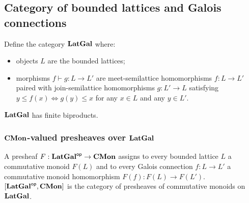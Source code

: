 \subsection{Category of bounded lattices and Galois connections}

Define the category $\mathbf{LatGal}$ where:
\begin{itemize}
\item objects $L$ are the bounded lattices;
\item morphisms $f \vdash g: L \to L'$ are meet-semilattice homomorphisms $f: L \to L'$ paired with
join-semilattice homomorphisms $g: L' \to L$ satisfying $y \leq f(x) \iff g(y) \leq x$ for any $x \in L$ and any
$y \in L'$.
\end{itemize}

\noindent $\mathbf{LatGal}$ has finite biproducts.

\subsubsection{$\mathbf{CMon}$-valued presheaves over $\mathbf{LatGal}$}

A presheaf $F: \mathbf{LatGal}^{\mathsf{op}} \to \mathbf{CMon}$ assigns to every bounded lattice $L$ a commutative monoid $F(L)$ and to
every Galois connection $f: L \to L'$ a commutative monoid homomorphism $F(f): F(L) \to F(L')$.
$[\mathbf{LatGal}^{\mathsf{op}},\mathbf{CMon}]$ is the category of presheaves of commutative monoids on $\mathbf{LatGal}$.
